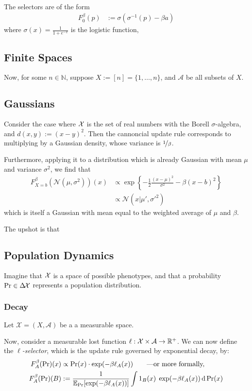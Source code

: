 \documentclass{article}
\begin{document}
The selectors are of the form
\begin{align*}
    F_0^\beta(p) &:= \sigma( \sigma^{-1}(p) - \beta a)
\end{align*}
where $\sigma(x) = \frac{1}{1 + e^{-x}}$ is the logistic function,

\subsection{Finite Spaces}
Now, for some $n \in \mathbb N$, suppose $X := [n] = \{1, \ldots, n\}$, and $\mathcal A$ be all subsets of $X$.

\subsection{Gaussians}
Consider the case where $\mathcal X$ is the set of real numbers with the Borell $\sigma$-algebra, and $d(x,y) := (x-y)^2$.
Then the cannoncial update rule corresponds to multiplying by a Gaussian density, whose variance is $\nicefrac1\beta$.

Furthermore, applying it to a distribution which is already Gaussian with mean $\mu$ and variance $\sigma^2$, we find that
\begin{align*}
    F^{\beta}_{X=b}(\mathcal N(\mu, \sigma^2))(x) &\propto
        \exp\left\{ - \frac12 \frac{(x-\mu)^2}{ \sigma^2 } - \beta(x-b)^2\right\}
    \\&\propto \mathcal N(x| \mu', \sigma'^2)
\end{align*}
which is itself a Gaussian with mean equal to the weighted average of $\mu$ and $\beta$.

The upshot is that

\subsection{Population Dynamics}
Imagine that $\mathcal X$ is a space of possible phenotypes, and that a probability $\Pr \in \Delta\!\mathcal X$ represents a population distribution.

\subsubsection{Decay}
Let $\mathcal X = (X, \mathcal A)$ be a a measurable space.



Now, consider a measurable lost function
$\ell: \mathcal X\times\mathcal A \to \mathbb R^+$.
We can now define the \emph{$\ell$-selector}, which is the
update rule governed by exponential decay, by:
\def\cost#1#2{\ell_{#2}(#1)}
\begin{align*}
    F^\beta_A(\Pr)(x) &\propto \Pr(x) \cdot \exp(-\beta \cost xA)
        \qquad\text{---or more formally,}\\
    F^\beta_A(\Pr)(B) &:=  \frac{1}{\Ex_{\Pr}[\exp(-\beta \cost xA )]}
        \int 1_B(x) \; \exp(-\beta \cost xA ) \,\mathrm d\Pr(x)
\end{align*}
\end{document}
